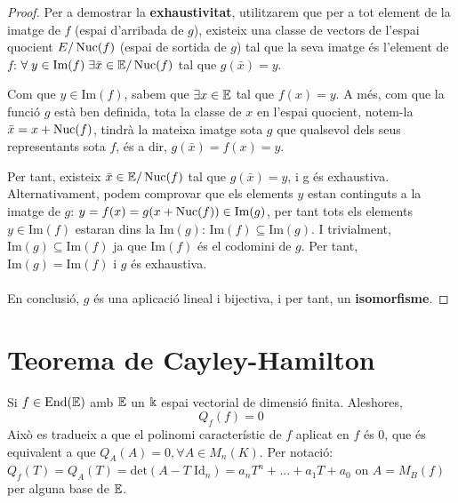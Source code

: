 \begin{proof}
Per a demostrar la \textbf{exhaustivitat}, utilitzarem que per a tot element de la imatge de $f$ (espai d'arribada de $g$), existeix una classe de vectors de l'espai quocient $E/\operatorname{Nuc}(f)$ (espai de sortida de $g$) tal que la seva imatge és l'element de $f$: $\forall \; y \in \text{Im}(f) \; \exists \bar{x} \in \mathbb{E}/\operatorname{Nuc}(f)$ tal que $g(\bar{x}) = y$.


Com que $y \in \text{Im}(f)$, sabem que $\exists x \in \mathbb{E}$ tal que $f(x) = y$. A més, com que la funció $g$ està ben definida, tota la classe de $x$ en l'espai quocient, notem-la $\bar{x} = x + \operatorname{Nuc}(f)$, tindrà la mateixa imatge sota $g$ que qualsevol dels seus representants sota $f$, és a dir, $g(\bar{x}) = f(x) = y$.

Per tant, existeix $\bar{x} \in \mathbb{E}/\operatorname{Nuc}(f)$ tal que $g(\bar{x}) = y$, i g és exhaustiva. 
\\

Alternativament, podem comprovar que els elements $y$ estan continguts a la imatge de $g$: $y = f(x) = g(x + \operatorname{Nuc}(f)) \in \text{Im}(g)$, per tant tots els elements $y \in \text{Im}(f)$ estaran dins la $\text{Im}(g)$: $\text{Im}(f) \subseteq \text{Im}(g)$. I trivialment, $\text{Im}(g) \subseteq \text{Im}(f)$ ja que $\text{Im}(f)$ és el codomini de $g$. Per tant, $\text{Im}(g) = \text{Im}(f)$ i $g$ és exhaustiva.
\\\\
En conclusió, $g$ és una aplicació lineal i bijectiva, i per tant, un \textbf{isomorfisme}.
\end{proof}

\section{Teorema de Cayley-Hamilton}
Si $f \in \text{End}(\mathbb{E})$ amb $\mathbb{E}$ un $\Bbbk$ espai vectorial de dimensió finita. Aleshores, 
\[
Q_f(f) = 0 
\]
Això es tradueix a que el polinomi característic de $f$ aplicat en $f$ és 0, que és equivalent a que $Q_A(A) = 0, \forall A \in M_n(K)$. Per notació: $Q_f(T) = Q_A(T) = \text{det}(A - T\;\text{Id}_n) = a_nT^n +...+a_1T + a_0$ on $A = M_B(f)$ per alguna base de $\mathbb{E}$.
\\

